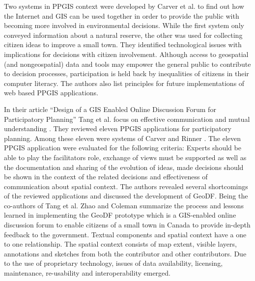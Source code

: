 Two systems in PPGIS context were developed by Carver et al. \cite{Carver2001_PPGIS_Cyberdemocracy} to find out how the Internet and GIS can be used together in order to provide the public with becoming more involved in environmental decisions. While the first system only conveyed information about a natural reserve, the other was used for collecting citizen ideas to improve a small town. They identified technological issues with implications for decisions with citizen involvement. Although access to geospatial (and nongeospatial) data and tools may empower the general public to contribute to decision processes, participation is held back by inequalities of citizens in their computer literacy. The authors also list principles for future implementations of web based PPGIS applications.

In their article ``Design of a GIS Enabled Online Discussion Forum for Participatory Planning'' Tang et al. focus on effective communication and mutual understanding \cite{Tang2005_PPGIS_discussion_forum}. They reviewed eleven PPGIS applications for participatory planning. Among these eleven were systems of Carver \cite{Carver2001_PPGIS_Cyberdemocracy} and Rinner \cite{Rinner_ArgumentationMaps}. The eleven PPGIS application were evaluated for the following criteria: Experts should be able to play the facilitators role, exchange of views must be supported as well as the documentation and sharing of the evolution of ideas, made decisions should be shown in the context of the related decisions and effectiveness of communication about spatial context. The authors revealed several shortcomings of the reviewed applications and discussed the development of GeoDF. Being the co-authors of Tang et al. \cite{Tang2005_PPGIS_discussion_forum} Zhao and Coleman \cite{zhao2006geodf} summarize the process and lessons learned in implementing the GeoDF prototype which is a GIS-enabled online discussion forum to enable citizens of a small town in Canada to provide in-depth feedback to the government. Textual components and spatial context have a one to one relationship. The spatial context consists of map extent, visible layers, annotations and sketches from both the contributor and other contributors. Due to the use of proprietary technology, issues of data availability, licensing, maintenance, re-usability and interoperability emerged.

